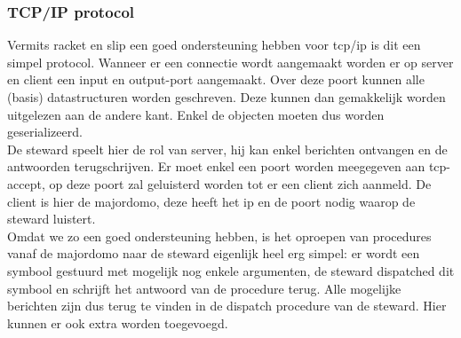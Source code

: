 \documentclass{article}
\begin{document}
\subsubsection{TCP/IP protocol}
\label{ssub:tcp-ip}
Vermits racket en slip een goed ondersteuning hebben voor tcp/ip is dit een simpel protocol. Wanneer er een connectie wordt aangemaakt worden er op server en client een input en output-port aangemaakt. Over deze poort kunnen alle (basis) datastructuren worden geschreven. Deze kunnen dan gemakkelijk worden uitgelezen aan de andere kant. Enkel de objecten moeten dus worden geserializeerd.\\
De steward speelt hier de rol van server, hij kan enkel berichten ontvangen en de antwoorden terugschrijven. Er moet enkel een poort worden meegegeven aan tcp-accept, op deze poort zal geluisterd worden tot er een client zich aanmeld. De client is hier de majordomo, deze heeft het ip en de poort nodig waarop de steward luistert.\\
Omdat we zo een goed ondersteuning hebben, is het oproepen van procedures vanaf de majordomo naar de steward eigenlijk heel erg simpel: er wordt een symbool gestuurd met mogelijk nog enkele argumenten, de steward dispatched dit symbool en schrijft het antwoord van de procedure terug. Alle mogelijke berichten zijn dus terug te vinden in de dispatch procedure van de steward. Hier kunnen er ook extra worden toegevoegd.
\end{document}
